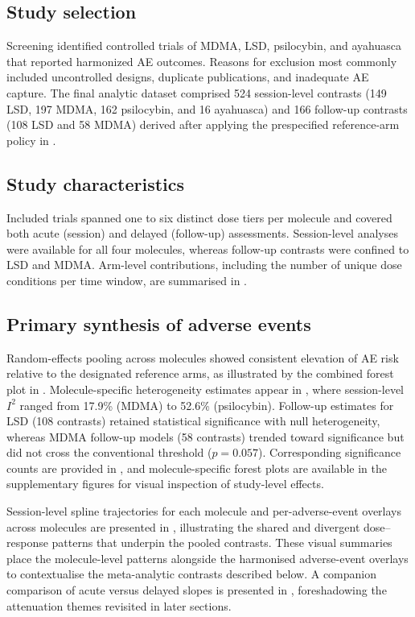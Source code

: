 \subsection{Study selection}
Screening identified controlled trials of MDMA, LSD, psilocybin, and ayahuasca that reported harmonized AE outcomes. Reasons for exclusion most commonly included uncontrolled designs, duplicate publications, and inadequate AE capture. The final analytic dataset comprised 524 session-level contrasts (149 LSD, 197 MDMA, 162 psilocybin, and 16 ayahuasca) and 166 follow-up contrasts (108 LSD and 58 MDMA) derived after applying the prespecified reference-arm policy in .

\subsection{Study characteristics}
Included trials spanned one to six distinct dose tiers per molecule and covered both acute (session) and delayed (follow-up) assessments. Session-level analyses were available for all four molecules, whereas follow-up contrasts were confined to LSD and MDMA. Arm-level contributions, including the number of unique dose conditions per time window, are summarised in .

\subsection{Primary synthesis of adverse events}
Random-effects pooling across molecules showed consistent elevation of AE risk relative to the designated reference arms, as illustrated by the combined forest plot in . Molecule-specific heterogeneity estimates appear in , where session-level $I^2$ ranged from 17.9\% (MDMA) to 52.6\% (psilocybin). Follow-up estimates for LSD (108 contrasts) retained statistical significance with null heterogeneity, whereas MDMA follow-up models (58 contrasts) trended toward significance but did not cross the conventional threshold ($p=0.057$). Corresponding significance counts are provided in , and molecule-specific forest plots are available in the supplementary figures for visual inspection of study-level effects.

Session-level spline trajectories for each molecule and per-adverse-event overlays across molecules are presented in , illustrating the shared and divergent dose--response patterns that underpin the pooled contrasts. These visual summaries place the molecule-level patterns alongside the harmonised adverse-event overlays to contextualise the meta-analytic contrasts described below. A companion comparison of acute versus delayed slopes is presented in , foreshadowing the attenuation themes revisited in later sections.


